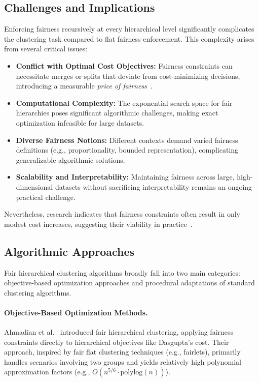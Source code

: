 \subsection{Challenges and Implications}

Enforcing fairness recursively at every hierarchical level
significantly complicates the clustering task compared to flat
fairness enforcement. This complexity arises from several critical issues:

\begin{itemize}
  \item \textbf{Conflict with Optimal Cost Objectives:} Fairness
    constraints can necessitate merges or splits that deviate from
    cost-minimizing decisions, introducing a measurable \emph{price
    of fairness}~\cite{ahmadian2020}.
  \item \textbf{Computational Complexity:} The exponential search
    space for fair hierarchies poses significant algorithmic
    challenges, making exact optimization infeasible for large datasets.
  \item \textbf{Diverse Fairness Notions:} Different contexts demand
    varied fairness definitions (e.g., proportionality, bounded
    representation), complicating generalizable algorithmic solutions.
  \item \textbf{Scalability and Interpretability:} Maintaining
    fairness across large, high-dimensional datasets without
    sacrificing interpretability remains an ongoing practical challenge.
\end{itemize}

Nevertheless, research indicates that fairness constraints often
result in only modest cost increases, suggesting their viability in
practice~\cite{knittel2023}.

\subsection{Algorithmic Approaches}

Fair hierarchical clustering algorithms broadly fall into two main
categories: objective-based optimization approaches and procedural
adaptations of standard clustering algorithms.

\paragraph{Objective-Based Optimization Methods.} Ahmadian et
al.~\cite{ahmadian2020} introduced fair hierarchical clustering,
applying fairness constraints directly to hierarchical objectives
like Dasgupta’s cost. Their approach, inspired by fair flat
clustering techniques (e.g., fairlets), primarily handles scenarios
involving two groups and yields relatively high polynomial
approximation factors (e.g., $O(n^{5/6}\cdot \text{polylog}(n))$).

